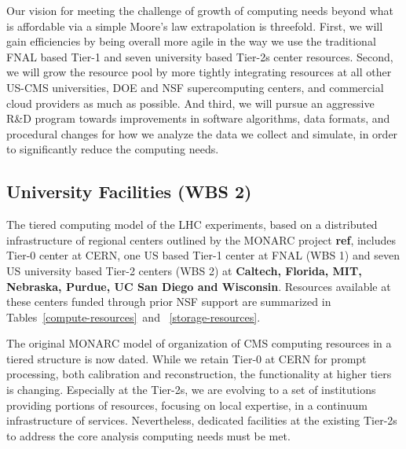 \documentclass[11pt,a4paper]{article}
\begin{document}
Our vision for meeting the challenge of growth of computing needs
beyond what is affordable via a simple Moore's law extrapolation is
threefold. First, we will gain efficiencies by being overall more
agile in the way we use the traditional FNAL based Tier-1 and seven
university based Tier-2s center resources. Second, we will grow the
resource pool by more tightly integrating resources at all other
US-CMS universities, DOE and NSF supercomputing centers, and
commercial cloud providers as much as possible. And third, we will
pursue an aggressive R\&D program towards improvements in software
algorithms, data formats, and procedural changes for how we analyze
the data we collect and simulate, in order to significantly reduce the
computing needs.

\subsection{University Facilities (WBS 2)}

The tiered computing model of the LHC experiments, based on a 
distributed infrastructure of regional centers outlined by
the MONARC project {\bf ref}, includes Tier-0 center at CERN,
one US based Tier-1 center at FNAL (WBS 1) and seven US 
university based Tier-2 centers (WBS 2) at 
{\bf Caltech, Florida, MIT, Nebraska, Purdue, UC San Diego and Wisconsin}.
Resources available at these centers funded through prior NSF
support are summarized in Tables~\ref{compute-resources}~and~
\ref{storage-resources}.

The original MONARC model of organization of CMS computing resources
in a tiered structure is now dated. While we retain Tier-0 at CERN for
prompt processing, both calibration and reconstruction, the
functionality at higher tiers is changing. Especially at the Tier-2s,
we are evolving to a set of institutions providing portions of
resources, focusing on local expertise, in a continuum infrastructure
of services. Nevertheless, dedicated facilities at the existing
Tier-2s to address the core analysis computing needs must be met.
\end{document}
